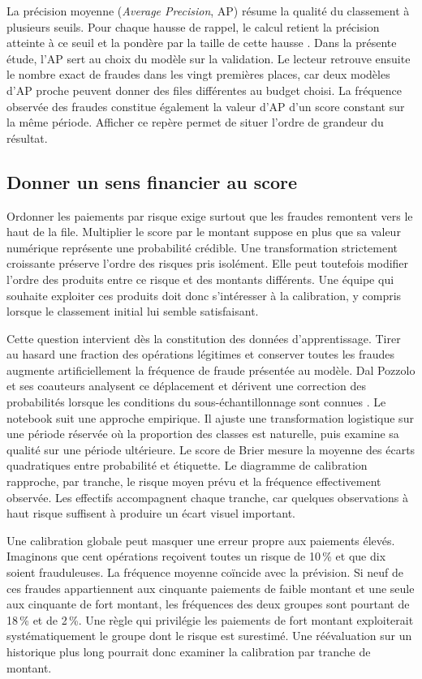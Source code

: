 \documentclass[11pt,a4paper]{article}
\begin{document}
La précision moyenne (\emph{Average Precision}, AP) résume la qualité du classement à plusieurs seuils. Pour chaque hausse de rappel, le calcul retient la précision atteinte à ce seuil et la pondère par la taille de cette hausse \cite{sklearnAP}. Dans la présente étude, l'AP sert au choix du modèle sur la validation. Le lecteur retrouve ensuite le nombre exact de fraudes dans les vingt premières places, car deux modèles d'AP proche peuvent donner des files différentes au budget choisi. La fréquence observée des fraudes constitue également la valeur d'AP d'un score constant sur la même période. Afficher ce repère permet de situer l'ordre de grandeur du résultat.

\subsection{Donner un sens financier au score}

Ordonner les paiements par risque exige surtout que les fraudes remontent vers le haut de la file. Multiplier le score par le montant suppose en plus que sa valeur numérique représente une probabilité crédible. Une transformation strictement croissante préserve l'ordre des risques pris isolément. Elle peut toutefois modifier l'ordre des produits entre ce risque et des montants différents. Une équipe qui souhaite exploiter ces produits doit donc s'intéresser à la calibration, y compris lorsque le classement initial lui semble satisfaisant.

Cette question intervient dès la constitution des données d'apprentissage. Tirer au hasard une fraction des opérations légitimes et conserver toutes les fraudes augmente artificiellement la fréquence de fraude présentée au modèle. Dal Pozzolo et ses coauteurs analysent ce déplacement et dérivent une correction des probabilités lorsque les conditions du sous-échantillonnage sont connues \cite{dalpozzolo2015}. Le notebook suit une approche empirique. Il ajuste une transformation logistique sur une période réservée où la proportion des classes est naturelle, puis examine sa qualité sur une période ultérieure. Le score de Brier mesure la moyenne des écarts quadratiques entre probabilité et étiquette. Le diagramme de calibration rapproche, par tranche, le risque moyen prévu et la fréquence effectivement observée. Les effectifs accompagnent chaque tranche, car quelques observations à haut risque suffisent à produire un écart visuel important.

Une calibration globale peut masquer une erreur propre aux paiements élevés. Imaginons que cent opérations reçoivent toutes un risque de 10\,\% et que dix soient frauduleuses. La fréquence moyenne coïncide avec la prévision. Si neuf de ces fraudes appartiennent aux cinquante paiements de faible montant et une seule aux cinquante de fort montant, les fréquences des deux groupes sont pourtant de 18\,\% et de 2\,\%. Une règle qui privilégie les paiements de fort montant exploiterait systématiquement le groupe dont le risque est surestimé. Une réévaluation sur un historique plus long pourrait donc examiner la calibration par tranche de montant.
\end{document}
